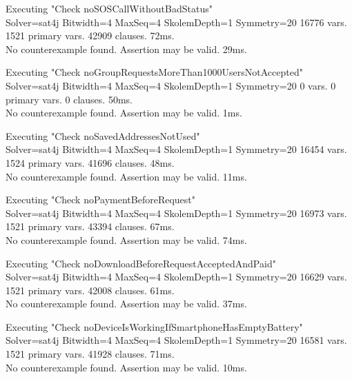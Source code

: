   \vspace{1cm}

   Executing "Check noSOSCallWithoutBadStatus" \\ \noindent
      Solver=sat4j Bitwidth=4 MaxSeq=4 SkolemDepth=1 Symmetry=20
      16776 vars. 1521 primary vars. 42909 clauses. 72ms. \\ \noindent
      No counterexample found. Assertion may be valid. 29ms.

   \vspace{1cm}

   Executing "Check noGroupRequestsMoreThan1000UsersNotAccepted" \\ \noindent
      Solver=sat4j Bitwidth=4 MaxSeq=4 SkolemDepth=1 Symmetry=20
      0 vars. 0 primary vars. 0 clauses. 50ms. \\ \noindent
      No counterexample found. Assertion may be valid. 1ms.

   \vspace{1cm}

   Executing "Check noSavedAddressesNotUsed" \\ \noindent
      Solver=sat4j Bitwidth=4 MaxSeq=4 SkolemDepth=1 Symmetry=20
      16454 vars. 1524 primary vars. 41696 clauses. 48ms. \\ \noindent
      No counterexample found. Assertion may be valid. 11ms.

   \vspace{1cm}

   Executing "Check noPaymentBeforeRequest" \\ \noindent
      Solver=sat4j Bitwidth=4 MaxSeq=4 SkolemDepth=1 Symmetry=20
      16973 vars. 1521 primary vars. 43394 clauses. 67ms. \\ \noindent
      No counterexample found. Assertion may be valid. 74ms.

   \vspace{1cm}

   Executing "Check noDownloadBeforeRequestAcceptedAndPaid" \\ \noindent
      Solver=sat4j Bitwidth=4 MaxSeq=4 SkolemDepth=1 Symmetry=20
      16629 vars. 1521 primary vars. 42008 clauses. 61ms. \\ \noindent
      No counterexample found. Assertion may be valid. 37ms.

   \vspace{1cm}

   Executing "Check noDeviceIsWorkingIfSmartphoneHasEmptyBattery" \\ \noindent
      Solver=sat4j Bitwidth=4 MaxSeq=4 SkolemDepth=1 Symmetry=20
      16581 vars. 1521 primary vars. 41928 clauses. 71ms. \\ \noindent
      No counterexample found. Assertion may be valid. 10ms.

